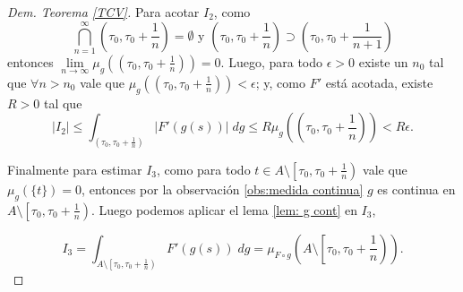 \begin{proof}[Dem. Teorema \eqref{TCV}]
Para acotar $I_2$, como $$\bigcap_{n=1}^{\infty}\left( \tau_0,\tau_0+\frac{1}{n}\right) =\emptyset \text{ y }  \left( \tau_0,\tau_0+\frac{1}{n}\right) \supset \left( \tau_0,\tau_0+\frac{1}{n+1}\right) $$
	entonces $\lim\limits_{n\to \infty}\mu_{g}\left( \left( \tau_0,\tau_0+\frac{1}{n}\right)\right)=0 $. 
Luego, para todo $\epsilon>0$ existe un $n_0$ tal que $\forall n>n_0$ vale que   $\mu_{g}\left( \left( \tau_0,\tau_0+\frac{1}{n}\right)\right)<\epsilon$; y,  como $F'$ está acotada, existe $R>0$ tal que 
\begin{equation*}
	\left|I_2\right| \leq\int_{(\tau_0,\tau_0+\frac{1}{n})}|F'(g(s))|\; dg 
  \leq R \mu_{g}\left( \left( \tau_0,\tau_0+\frac{1}{n}\right)\right)<R\epsilon. 
\end{equation*}

 Finalmente para estimar $I_3$, como para todo $t\in A\setminus\left[\tau_0,\tau_0+\frac{1}{n}\right)$ vale que $\mu_g(\{t\})=0$, entonces por la observación \ref{obs:medida continua}  $g$ es continua en $A\setminus\left[\tau_0,\tau_0+\frac{1}{n}\right)$. Luego podemos aplicar el lema \ref{lem: g cont} en $I_3$,


 
 \begin{equation*}
		I_3=\int_{A\setminus\left[\tau_0,\tau_0+\frac{1}{n}\right)}F'(g(s))\; dg=\mu_{F\circ g}\left( A\setminus\left[ \tau_0,\tau_0+\frac{1}{n}\right) \right). 
	\end{equation*}


\end{proof}
